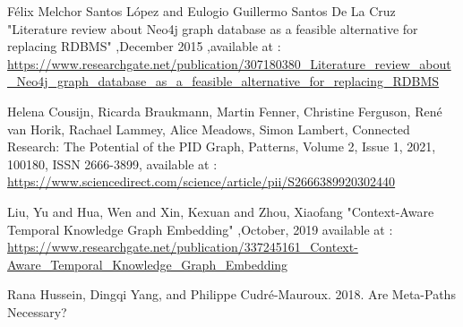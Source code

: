 \documentclass[conference]{IEEEtran}
\begin{document}
\begin{thebibliography}{00}
Félix Melchor Santos López and Eulogio Guillermo Santos De La Cruz "Literature review about Neo4j graph database as a feasible alternative for replacing RDBMS" ,December 2015 ,available at : \url{https://www.researchgate.net/publication/307180380_Literature_review_about_Neo4j_graph_database_as_a_feasible_alternative_for_replacing_RDBMS}


 Helena Cousijn, Ricarda Braukmann, Martin Fenner, Christine Ferguson, René van Horik, Rachael Lammey, Alice Meadows, Simon Lambert,
Connected Research: The Potential of the PID Graph,
Patterns,
Volume 2, Issue 1,
2021,
100180,
ISSN 2666-3899,
available at : \url{https://www.sciencedirect.com/science/article/pii/S2666389920302440}

Liu, Yu and Hua, Wen and Xin, Kexuan and Zhou, Xiaofang "Context-Aware Temporal Knowledge Graph Embedding" ,October, 2019
available at : \url{https://www.researchgate.net/publication/337245161_Context-Aware_Temporal_Knowledge_Graph_Embedding}

Rana Hussein, Dingqi Yang, and Philippe Cudré-Mauroux. 2018. Are Meta-Paths Necessary?





\end{thebibliography}
\end{document}

